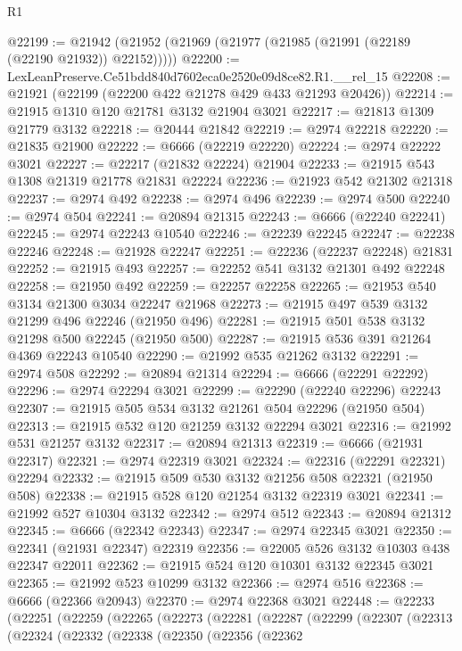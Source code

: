 \begin{lexlean}{R1}
\begin{coremodule}
@22199 := @21942 (@21952 (@21969 (@21977 (@21985 (@21991 (@22189 (@22190 @21932)) @22152)))))
@22200 := LexLeanPreserve.Ce51bdd840d7602eca0e2520e09d8ce82.R1.__rel_15
@22208 := @21921 (@22199 (@22200 @422 @21278 @429 @433 @21293 @20426))
@22214 := @21915 @1310 @120 @21781 @3132 @21904 @3021
@22217 := @21813 @1309 @21779 @3132
@22218 := @20444 @21842
@22219 := @2974 @22218
@22220 := @21835 @21900
@22222 := @6666 (@22219 @22220)
@22224 := @2974 @22222 @3021
@22227 := @22217 (@21832 @22224) @21904
@22233 := @21915 @543 @1308 @21319 @21778 @21831 @22224
@22236 := @21923 @542 @21302 @21318
@22237 := @2974 @492
@22238 := @2974 @496
@22239 := @2974 @500
@22240 := @2974 @504
@22241 := @20894 @21315
@22243 := @6666 (@22240 @22241)
@22245 := @2974 @22243 @10540
@22246 := @22239 @22245
@22247 := @22238 @22246
@22248 := @21928 @22247
@22251 := @22236 (@22237 @22248) @21831
@22252 := @21915 @493
@22257 := @22252 @541 @3132 @21301 @492 @22248
@22258 := @21950 @492
@22259 := @22257 @22258
@22265 := @21953 @540 @3134 @21300 @3034 @22247 @21968
@22273 := @21915 @497 @539 @3132 @21299 @496 @22246 (@21950 @496)
@22281 := @21915 @501 @538 @3132 @21298 @500 @22245 (@21950 @500)
@22287 := @21915 @536 @391 @21264 @4369 @22243 @10540
@22290 := @21992 @535 @21262 @3132
@22291 := @2974 @508
@22292 := @20894 @21314
@22294 := @6666 (@22291 @22292)
@22296 := @2974 @22294 @3021
@22299 := @22290 (@22240 @22296) @22243
@22307 := @21915 @505 @534 @3132 @21261 @504 @22296 (@21950 @504)
@22313 := @21915 @532 @120 @21259 @3132 @22294 @3021
@22316 := @21992 @531 @21257 @3132
@22317 := @20894 @21313
@22319 := @6666 (@21931 @22317)
@22321 := @2974 @22319 @3021
@22324 := @22316 (@22291 @22321) @22294
@22332 := @21915 @509 @530 @3132 @21256 @508 @22321 (@21950 @508)
@22338 := @21915 @528 @120 @21254 @3132 @22319 @3021
@22341 := @21992 @527 @10304 @3132
@22342 := @2974 @512
@22343 := @20894 @21312
@22345 := @6666 (@22342 @22343)
@22347 := @2974 @22345 @3021
@22350 := @22341 (@21931 @22347) @22319
@22356 := @22005 @526 @3132 @10303 @438 @22347 @22011
@22362 := @21915 @524 @120 @10301 @3132 @22345 @3021
@22365 := @21992 @523 @10299 @3132
@22366 := @2974 @516
@22368 := @6666 (@22366 @20943)
@22370 := @2974 @22368 @3021
@22448 := @22233
    (@22251
      (@22259
        (@22265
          (@22273
            (@22281
              (@22287
                (@22299
                  (@22307
                    (@22313
                      (@22324
                        (@22332
                          (@22338
                            (@22350
                              (@22356
                                (@22362

\end{coremodule}
\end{lexlean}
